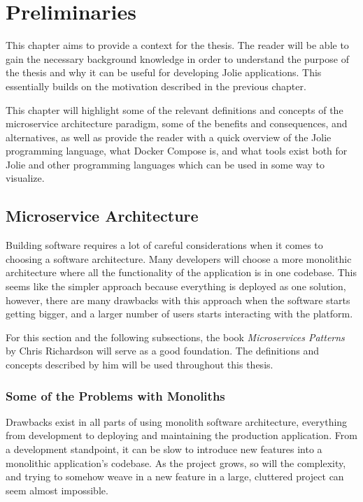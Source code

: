 \chapter{Preliminaries}
This chapter aims to provide a context for the thesis.
The reader will be able to gain the necessary background knowledge in order
to understand the purpose of the thesis and why it can be useful for developing Jolie applications. This 
essentially builds on the motivation
described in the previous chapter.

This chapter will highlight some of the relevant definitions and concepts of the microservice architecture paradigm, some of the benefits and consequences, and alternatives, as
 well as provide
the reader with a quick overview of the Jolie programming language,
what Docker Compose is, and what tools exist both for Jolie and 
other programming languages which can be used in some way to visualize.

\section{Microservice Architecture}
Building software requires a lot of careful considerations when it comes
to choosing a software architecture. Many developers will choose a more monolithic architecture where all
 the functionality of the application
is in one codebase. This seems like the simpler approach because everything is deployed as one solution, however,
 there are many drawbacks
with this approach when the software starts getting bigger, and a larger number of users starts 
interacting with the platform.

For this section and the following subsections, the book \textit{Microservices Patterns} by Chris Richardson \cite*{microservicepatterns} will serve as a good foundation. 
The definitions and concepts described by him will be used throughout this thesis.

\subsection{Some of the Problems with Monoliths}
Drawbacks exist in all parts of using monolith software architecture, everything from development to 
deploying and maintaining the production application.
From a development standpoint, it can be slow to introduce new features into a monolithic application's
 codebase. As the project grows, so will the complexity, and trying to somehow weave in a new feature in a large, cluttered project can seem almost impossible.

